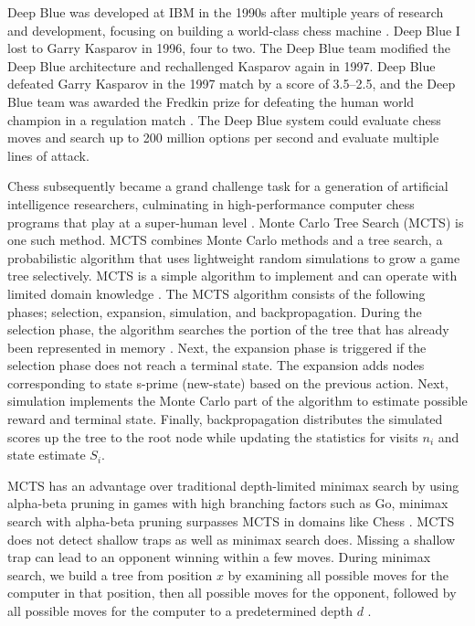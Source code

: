 \documentclass[12pt]{turabian-researchpaper}
\begin{document}
Deep Blue was developed at IBM in the 1990s after multiple years of research and development, focusing on building a world-class chess machine \parencite{campbell_deep_2002}. Deep Blue I lost to Garry Kasparov in 1996, four to two. The Deep Blue team modified the Deep Blue architecture and rechallenged Kasparov again in 1997. Deep Blue defeated Garry Kasparov in the 1997 match by a score of 3.5–2.5, and the Deep Blue team was awarded the Fredkin prize for defeating the human world champion in a regulation match \parencite{campbell_deep_2002}. The Deep Blue system could evaluate chess moves and search up to 200 million options per second and evaluate multiple lines of attack. 

Chess subsequently became a grand challenge task for a generation of artificial intelligence researchers, culminating in high-performance computer chess programs that play at a super-human level \parencite{silver_general_2018}. Monte Carlo Tree Search (MCTS) is one such method. MCTS combines Monte Carlo methods and a tree search, a probabilistic algorithm that uses lightweight random simulations to grow a game tree selectively. MCTS is a simple algorithm to implement and can operate with limited domain knowledge \parencite{choudhary_introduction_2019}. The MCTS algorithm consists of the following phases; selection, expansion, simulation, and backpropagation. During the selection phase, the algorithm searches the portion of the tree that has already been represented in memory \parencite{swiechowski2021}. Next, the expansion phase is triggered if the selection phase does not reach a terminal state. The expansion adds nodes corresponding to state s-prime (new-state) based on the previous action. Next, simulation implements the Monte Carlo part of the algorithm to estimate possible reward and terminal state. Finally, backpropagation distributes the simulated scores up the tree to the root node while updating the statistics for visits \(n_i\) and state estimate \(S_i\). 

MCTS has an advantage over traditional depth-limited minimax search by using alpha-beta pruning in games with high branching factors such as Go, minimax search with alpha-beta pruning surpasses MCTS in domains like Chess \parencite{lin_monte_2017}. MCTS does not detect shallow traps as well as minimax search does. Missing a shallow trap can lead to an opponent winning within a few moves.  During minimax search, we build a tree from position \(x\) by examining all possible moves for the computer in that position, then all possible moves for the opponent, followed by all possible moves for the computer to a predetermined depth \(d\) \parencite{baxter_learning_2000}.  
\end{document}
